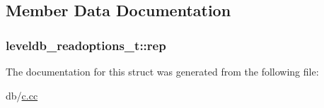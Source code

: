 \subsection{Member Data Documentation}
\hypertarget{structleveldb__readoptions__t_ad4bc0f881cf2c7a859642cd878dd568c}{}
\subsubsection[{rep}]{ leveldb\+\_\+readoptions\+\_\+t\+::rep}\label{structleveldb__readoptions__t_ad4bc0f881cf2c7a859642cd878dd568c}


The documentation for this struct was generated from the following file\+:\begin{DoxyCompactItemize}
\item 
db/\hyperlink{c_8cc}{c.\+cc}\end{DoxyCompactItemize}
